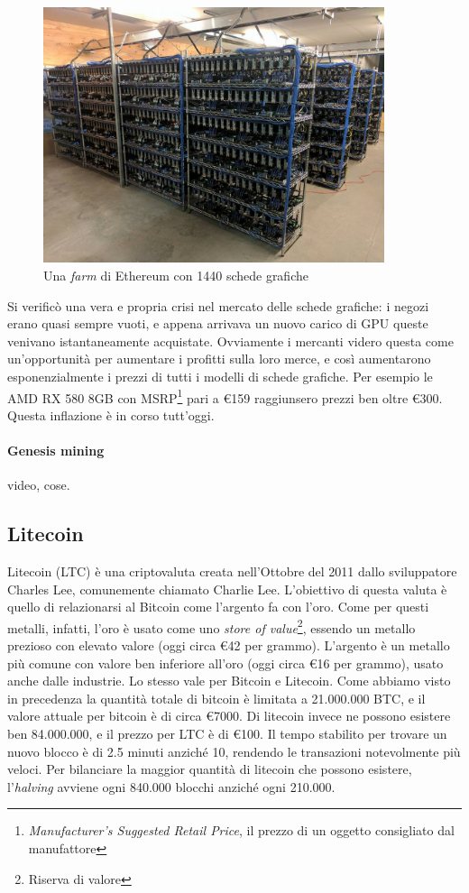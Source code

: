 \documentclass {article}
\begin{document}
\vspace {0.5cm}
\begin{figure}[htb!]
\includegraphics [width = 10cm] {ethfarm.jpeg}
\centering
\caption {Una \textit{farm} di Ethereum con 1440 schede grafiche}
\end{figure}
\vspace {0.2cm}
\noindent
%
Si verificò una vera e propria crisi nel mercato delle schede grafiche: i negozi erano quasi sempre vuoti, e appena arrivava un nuovo carico di GPU queste venivano istantaneamente acquistate.
Ovviamente i mercanti videro questa come un'opportunità per aumentare i profitti sulla loro merce, e così aumentarono esponenzialmente i prezzi di tutti i modelli di schede grafiche.
Per esempio le AMD RX 580 8GB con MSRP\footnote{\textit{Manufacturer's Suggested Retail Price}, il prezzo di un oggetto consigliato dal manufattore} pari a \euro{159} raggiunsero prezzi ben oltre \euro{300}.
Questa inflazione è in corso tutt'oggi.

\paragraph {Genesis mining}

video, cose.


\subsection {Litecoin}


Litecoin (LTC) è una criptovaluta creata nell'Ottobre del 2011 dallo sviluppatore Charles Lee, comunemente chiamato Charlie Lee. L'obiettivo di questa valuta è quello di relazionarsi al Bitcoin come l'argento fa con l'oro.
Come per questi metalli, infatti, l'oro è usato come uno \textit{store of value}\footnote{Riserva di valore}, essendo un metallo prezioso con elevato valore (oggi circa \euro{42} per grammo). L'argento è un metallo più comune con valore ben inferiore all'oro (oggi circa \euro{16} per grammo), usato anche dalle industrie.
Lo stesso vale per Bitcoin e Litecoin. Come abbiamo visto in precedenza la quantità totale di bitcoin è limitata a 21.000.000 BTC, e il valore attuale per bitcoin è di circa \euro{7000}.
Di litecoin invece ne possono esistere ben 84.000.000, e il prezzo per LTC è di \euro{100}.
Il tempo stabilito per trovare un nuovo blocco è di 2.5 minuti anziché 10, rendendo le transazioni notevolmente più veloci.
Per bilanciare la maggior quantità di litecoin che possono esistere, l'\textit{halving} avviene ogni 840.000 blocchi anziché ogni 210.000.
\end{document}
